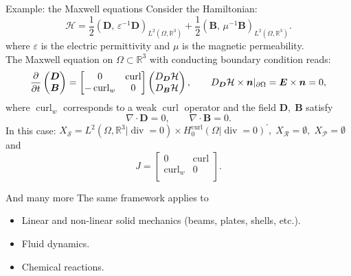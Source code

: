 \documentclass[aspectratio=169]{beamer}
\renewcommand{\div}{\operatorname{div}}
\DeclareMathOperator*{\curl}{curl}
\newcommand{\bbR}{\mathbb{R}}
\newcommand{\inpr}[3][]{\ensuremath{( #2, \, #3 )_{#1}}}
\begin{document}
\begin{frame}{Example: the Maxwell equations}
	Consider the Hamiltonian:
	\begin{equation*}
		\mathcal{H} = \frac{1}{2} \inpr[L^2(\Omega, \bbR^3)]{\bm{D}}{\varepsilon^{-1}\bm{D}} + \frac{1}{2} \inpr[L^2(\Omega, \bbR^3)]{\bm{B}}{\mu^{-1}\bm{B}}.
	\end{equation*}
where  $\varepsilon$ is the electric permittivity and $\mu$ is the magnetic permeability.\\
\vspace{.5cm}
	The Maxwell equation on $\Omega \subset \bbR^3$ with conducting boundary condition reads:
	\begin{equation*}
		\diffp{}{t}\begin{pmatrix}
			\bm{D} \\ \bm{B} 
		\end{pmatrix} = 
		\begin{bmatrix}
			0 & \curl \\
			-\curl_w & 0 \\
		\end{bmatrix}
		\begin{pmatrix}
			D_{\bm{D}}\mathcal{H} \\
			D_{\bm{B}}\mathcal{H} \\
		\end{pmatrix},\qquad D_{\bm{D}}\mathcal{H} \times \bm{n}|_{\partial\Omega}= \bm{E} \times \bm{n}=0,
	\end{equation*}
	where $\curl_w$ corresponds to a weak $\curl$ operator and the field $\bm{D}, \; \bm{B}$ satisfy
	\begin{equation*}
			\nabla \cdot \bm{D}= 0, \qquad	\nabla \cdot \bm{B}= 0.
	\end{equation*}
In this case: $X_{\mathcal{S}}= L^2(\Omega, \bbR^3|\div=0) \times H^{\curl}_0(\Omega| \div=0)^{'}, \; X_{\mathcal{R}} = \emptyset, \; X_{\mathcal{P}}= \emptyset$ and
\begin{equation*}
	J = \begin{bmatrix}
		0 & \curl \\
		\curl_w & 0 \\
	\end{bmatrix}.
\end{equation*}


	
	
\end{frame}

\begin{frame}{And many more}
	The same framework applies to
	\begin{itemize}
		\item Linear and non-linear solid mechanics (beams, plates, shells, etc.).\\
		\item Fluid dynamics. \\
		\item Chemical reactions.
	\end{itemize}
\end{frame}
\end{document}
